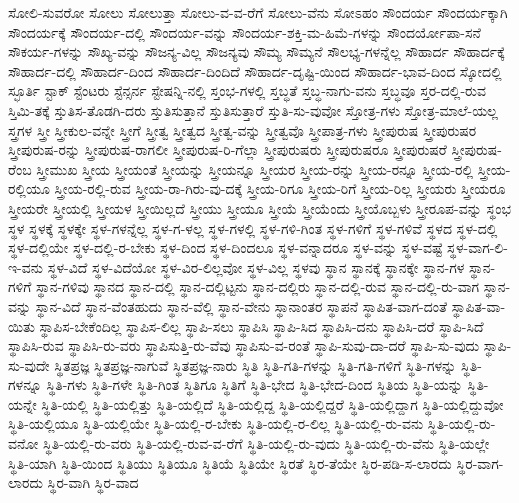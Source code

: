 {ಸೋಲಿ-ಸುವರೋ
ಸೋಲು
ಸೋಲುತ್ತಾ
ಸೋಲು-ವ-ವ-ರೆಗೆ
ಸೋಲು-ವೆನು
ಸೋಽಹಂ
ಸೌಂದರ್ಯ
ಸೌಂದರ್ಯಕ್ಕಾಗಿ
ಸೌಂದರ್ಯಕ್ಕೆ
ಸೌಂದರ್ಯ-ದಲ್ಲಿ
ಸೌಂದರ್ಯ-ವನ್ನು
ಸೌಂದರ್ಯ-ಶಕ್ತಿ-ಮ-ಹಿಮೆ-ಗಳನ್ನು
ಸೌಂದರ್ಯೋಪಾ-ಸನೆ
ಸೌಕರ್ಯ-ಗಳನ್ನು
ಸೌಖ್ಯ-ವನ್ನು
ಸೌಜನ್ಯ-ವಿಲ್ಲ
ಸೌಜನ್ಯವು
ಸೌಮ್ಯ
ಸೌಮ್ಯನೆ
ಸೌಲಭ್ಯ-ಗಳನ್ನೆಲ್ಲ
ಸೌಹಾರ್ದ
ಸೌಹಾರ್ದಕ್ಕೆ
ಸೌಹಾರ್ದ-ದಲ್ಲಿ
ಸೌಹಾರ್ದ-ದಿಂದ
ಸೌಹಾರ್ದ-ದಿಂದಿದೆ
ಸೌಹಾರ್ದ-ದೃಷ್ಟಿ-ಯಿಂದ
ಸೌಹಾರ್ದ-ಭಾವ-ದಿಂದ
ಸ್ಕೋದಲ್ಲಿ
ಸ್ಛೂರ್ತಿ
ಸ್ಟಾಕ್
ಸ್ಟೆಂಟರು
ಸ್ಟೆನ್ಸರ್ನ
ಸ್ಟೇಷನ್ನಿ-ನಲ್ಲಿ
ಸ್ತಂಭ-ಗಳಲ್ಲಿ
ಸ್ತಬ್ಧತೆ
ಸ್ತಬ್ಧ-ನಾಗು-ವನು
ಸ್ತಬ್ಧವೂ
ಸ್ತರ-ದಲ್ಲಿ-ರುವ
ಸ್ತಿಮಿ-ತಕ್ಕೆ
ಸ್ತುತಿಸ-ತೊಡಗಿ-ದರು
ಸ್ತುತಿಸುತ್ತಾನೆ
ಸ್ತುತಿಸುತ್ತಾರೆ
ಸ್ತುತಿ-ಸು-ವುವೋ
ಸ್ತೋತ್ರ-ಗಳು
ಸ್ತೋತ್ರ-ಮಾಲೆ-ಯಲ್ಲ
ಸ್ತ್ರಗಳ
ಸ್ತ್ರೀ
ಸ್ತ್ರೀಕುಲ-ವನ್ನೇ
ಸ್ತ್ರೀಗೆ
ಸ್ತ್ರೀತ್ವ
ಸ್ತ್ರೀತ್ವದ
ಸ್ತ್ರೀತ್ವ-ವನ್ನು
ಸ್ತ್ರೀತ್ವವೊ
ಸ್ತ್ರೀಪಾತ್ರ-ಗಳು
ಸ್ತ್ರೀಪುರುಷ
ಸ್ತ್ರೀಪುರುಷರ
ಸ್ತ್ರೀಪುರುಷ-ರನ್ನು
ಸ್ತ್ರೀಪುರುಷ-ರಾಗಲೀ
ಸ್ತ್ರೀಪುರುಷ-ರಿ-ಗೆಲ್ಲಾ
ಸ್ತ್ರೀಪುರುಷರು
ಸ್ತ್ರೀಪುರುಷರೂ
ಸ್ತ್ರೀಪುರುಷರೆ
ಸ್ತ್ರೀಪುರುಷ-ರೆಂಬ
ಸ್ತ್ರೀಮುಖ
ಸ್ತ್ರೀಯ
ಸ್ತ್ರೀಯಂತೆ
ಸ್ತ್ರೀಯನ್ನು
ಸ್ತ್ರೀಯನ್ನೂ
ಸ್ತ್ರೀಯರ
ಸ್ತ್ರೀಯ-ರನ್ನು
ಸ್ತ್ರೀಯ-ರನ್ನೂ
ಸ್ತ್ರೀಯ-ರಲ್ಲಿ
ಸ್ತ್ರೀಯ-ರಲ್ಲಿಯೂ
ಸ್ತ್ರೀಯ-ರಲ್ಲಿ-ರುವ
ಸ್ತ್ರೀಯ-ರಾ-ಗಿರು-ವು-ದಕ್ಕೆ
ಸ್ತ್ರೀಯ-ರಿಗೂ
ಸ್ತ್ರೀಯ-ರಿಗೆ
ಸ್ತ್ರೀಯ-ರಿಲ್ಲ
ಸ್ತ್ರೀಯರು
ಸ್ತ್ರೀಯರೂ
ಸ್ತ್ರೀಯರೇ
ಸ್ತ್ರೀಯಲ್ಲಿ
ಸ್ತ್ರೀಯಳ
ಸ್ತ್ರೀಯಿಲ್ಲದೆ
ಸ್ತ್ರೀಯು
ಸ್ತ್ರೀಯೂ
ಸ್ತ್ರೀಯೆ
ಸ್ತ್ರೀಯೆಂದು
ಸ್ತ್ರೀಯೊಬ್ಬಳು
ಸ್ತ್ರೀರೂಪ-ವನ್ನು
ಸ್ಥಂಭ
ಸ್ಥಳ
ಸ್ಥಳಕ್ಕೆ
ಸ್ಥಳಕ್ಕೇ
ಸ್ಥಳ-ಗಳನ್ನೆಲ್ಲ
ಸ್ಥಳ-ಗ-ಳಲ್ಲ
ಸ್ಥಳ-ಗಳಲ್ಲಿ
ಸ್ಥಳ-ಗಳಿ-ಗಿಂತ
ಸ್ಥಳ-ಗಳಿಗೆ
ಸ್ಥಳ-ಗಳಿವೆ
ಸ್ಥಳದ
ಸ್ಥಳ-ದಲ್ಲಿ
ಸ್ಥಳ-ದಲ್ಲಿಯೇ
ಸ್ಥಳ-ದಲ್ಲಿ-ರ-ಬೇಕು
ಸ್ಥಳ-ದಿಂದ
ಸ್ಥಳ-ದಿಂದಲೂ
ಸ್ಥಳ-ವನ್ನಾದರೂ
ಸ್ಥಳ-ವನ್ನು
ಸ್ಥಳ-ವಷ್ಟೆ
ಸ್ಥಳ-ವಾಗ-ಲಿ-ಇ-ವನು
ಸ್ಥಳ-ವಿದೆ
ಸ್ಥಳ-ವಿದೆಯೋ
ಸ್ಥಳ-ವಿರ-ಲಿಲ್ಲವೋ
ಸ್ಥಳ-ವಿಲ್ಲ
ಸ್ಥಳವು
ಸ್ಥಾನ
ಸ್ಥಾನಕ್ಕೆ
ಸ್ಥಾನಕ್ಕೇ
ಸ್ಥಾನ-ಗಳ
ಸ್ಥಾನ-ಗಳಿಗೆ
ಸ್ಥಾನ-ಗಳಿವು
ಸ್ಥಾನದ
ಸ್ಥಾನ-ದಲ್ಲಿ
ಸ್ಥಾನ-ದಲ್ಲಿಟ್ಟನು
ಸ್ಥಾನ-ದಲ್ಲಿರು
ಸ್ಥಾನ-ದಲ್ಲಿ-ರುವ
ಸ್ಥಾನ-ದಲ್ಲಿ-ರು-ವಾಗ
ಸ್ಥಾನ-ವನ್ನು
ಸ್ಥಾನ-ವಿದೆ
ಸ್ಥಾನ-ವೆಂತಹುದು
ಸ್ಥಾನ-ವೆಲ್ಲಿ
ಸ್ಥಾನ-ವೇನು
ಸ್ಥಾನಾಂತರ
ಸ್ಥಾಪನೆ
ಸ್ಥಾಪಿತ-ವಾಗ-ದಂತೆ
ಸ್ಥಾಪಿತ-ವಾ-ಯಿತು
ಸ್ಥಾಪಿಸ-ಬೇಕೆಂದಿಲ್ಲ
ಸ್ಥಾಪಿಸ-ಲಿಲ್ಲ
ಸ್ಥಾಪಿ-ಸಲು
ಸ್ಥಾಪಿಸಿ
ಸ್ಥಾಪಿ-ಸಿದ
ಸ್ಥಾಪಿಸಿ-ದನು
ಸ್ಥಾಪಿಸಿ-ದರೆ
ಸ್ಥಾಪಿ-ಸಿದೆ
ಸ್ಥಾಪಿಸಿ-ರುವ
ಸ್ಥಾಪಿಸಿ-ರು-ವರು
ಸ್ಥಾಪಿಸುತ್ತಿ-ರು-ವೆವು
ಸ್ಥಾಪಿಸು-ವ-ರಂತೆ
ಸ್ಥಾಪಿ-ಸುವು-ದಾ-ದರೆ
ಸ್ಥಾಪಿ-ಸು-ವುದು
ಸ್ಥಾಪಿ-ಸು-ವುದೇ
ಸ್ಥಿತಪ್ರಜ್ಞ
ಸ್ಥಿತಪ್ರಜ್ಞ-ನಾಗುವೆ
ಸ್ಥಿತಪ್ರಜ್ಞ-ನಾರು
ಸ್ಥಿತಿ
ಸ್ಥಿತಿ-ಗತಿ-ಗಳನ್ನು
ಸ್ಥಿತಿ-ಗತಿ-ಗಳಿಗೆ
ಸ್ಥಿತಿ-ಗಳನ್ನು
ಸ್ಥಿತಿ-ಗಳನ್ನೂ
ಸ್ಥಿತಿ-ಗಳು
ಸ್ಥಿತಿ-ಗಳೇ
ಸ್ಥಿತಿ-ಗಿಂತ
ಸ್ಥಿತಿಗೂ
ಸ್ಥಿತಿಗೆ
ಸ್ಥಿತಿ-ಭೇದ
ಸ್ಥಿತಿ-ಭೇದ-ದಿಂದ
ಸ್ಥಿತಿಯ
ಸ್ಥಿತಿ-ಯನ್ನು
ಸ್ಥಿತಿ-ಯನ್ನೇ
ಸ್ಥಿತಿ-ಯಲ್ಲಿ
ಸ್ಥಿತಿ-ಯಲ್ಲಿತ್ತು
ಸ್ಥಿತಿ-ಯಲ್ಲಿದೆ
ಸ್ಥಿತಿ-ಯಲ್ಲಿದ್ದ
ಸ್ಥಿತಿ-ಯಲ್ಲಿದ್ದರೆ
ಸ್ಥಿತಿ-ಯಲ್ಲಿದ್ದಾಗ
ಸ್ಥಿತಿ-ಯಲ್ಲಿದ್ದುವೋ
ಸ್ಥಿತಿ-ಯಲ್ಲಿಯೂ
ಸ್ಥಿತಿ-ಯಲ್ಲಿಯೇ
ಸ್ಥಿತಿ-ಯಲ್ಲಿ-ರ-ಬೇಕು
ಸ್ಥಿತಿ-ಯಲ್ಲಿ-ರ-ಲಿಲ್ಲ
ಸ್ಥಿತಿ-ಯಲ್ಲಿ-ರು-ವನು
ಸ್ಥಿತಿ-ಯಲ್ಲಿ-ರು-ವನೋ
ಸ್ಥಿತಿ-ಯಲ್ಲಿ-ರು-ವರು
ಸ್ಥಿತಿ-ಯಲ್ಲಿ-ರುವ-ವ-ರೆಗೆ
ಸ್ಥಿತಿ-ಯಲ್ಲಿ-ರು-ವುದು
ಸ್ಥಿತಿ-ಯಲ್ಲಿ-ರು-ವೆನು
ಸ್ಥಿತಿ-ಯಲ್ಲೇ
ಸ್ಥಿತಿ-ಯಾಗಿ
ಸ್ಥಿತಿ-ಯಿಂದ
ಸ್ಥಿತಿಯು
ಸ್ಥಿತಿಯೂ
ಸ್ಥಿತಿಯೆ
ಸ್ಥಿತಿಯೇ
ಸ್ಥಿರತೆ
ಸ್ಥಿರ-ತೆಯೇ
ಸ್ಥಿರ-ಪಡಿ-ಸ-ಲಾರದು
ಸ್ಥಿರ-ವಾಗ-ಲಾರದು
ಸ್ಥಿರ-ವಾಗಿ
ಸ್ಥಿರ-ವಾದ
}
